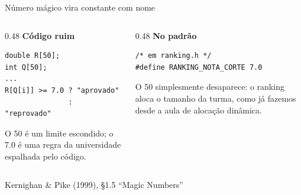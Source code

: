 \documentclass[aspectratio=169]{beamer}
\newcommand{\fonte}[1]{\vfill\hfill{\scriptsize\textcolor{UFSGray}{#1}}}
\begin{document}
\begin{frame}[fragile]{Número mágico vira constante com nome}
  \begin{columns}[T]
    \begin{column}{0.48\textwidth}
      \textcolor{UFSRed}{\textbf{Código ruim}}
\begin{lstlisting}[style=tinyC]
double R[50];
int Q[50];
...
R[Q[i]] >= 7.0 ? "aprovado"
               : "reprovado"
\end{lstlisting}
      \small O 50 é um limite escondido; o 7.0 é uma regra da universidade
      espalhada pelo código.
    \end{column}
    \begin{column}{0.48\textwidth}
      \textcolor{UFSBlue}{\textbf{No padrão}}
\begin{lstlisting}[style=tinyC]
/* em ranking.h */
#define RANKING_NOTA_CORTE 7.0
\end{lstlisting}
      \small O 50 simplesmente desaparece: o ranking aloca o tamanho da
      turma, como já fazemos desde a aula de alocação dinâmica.
    \end{column}
  \end{columns}
  \fonte{Kernighan \& Pike (1999), §1.5 ``Magic Numbers''~\cite{kernighan1999practice}}
\end{frame}
\end{document}

